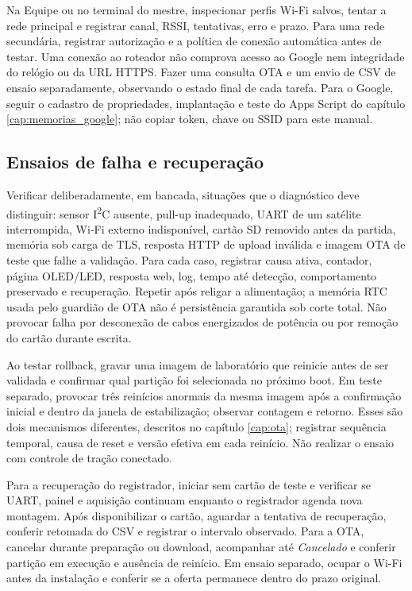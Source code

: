 Na Equipe ou no terminal do mestre, inspecionar perfis Wi-Fi salvos, tentar a rede principal e registrar canal, RSSI, tentativas, erro e prazo. Para uma rede secundária, registrar autorização e a política de conexão automática antes de testar. Uma conexão ao roteador não comprova acesso ao Google nem integridade do relógio ou da URL HTTPS. Fazer uma consulta OTA e um envio de CSV de ensaio separadamente, observando o estado final de cada tarefa. Para o Google, seguir o cadastro de propriedades, implantação e teste do Apps Script do capítulo \ref{cap:memorias_google}; não copiar token, chave ou SSID para este manual.

\subsection{Ensaios de falha e recuperação}\label{sec:ensaios-falha}
Verificar deliberadamente, em bancada, situações que o diagnóstico deve distinguir: sensor I\textsuperscript{2}C ausente, pull-up inadequado, UART de um satélite interrompida, Wi-Fi externo indisponível, cartão SD removido antes da partida, memória sob carga de TLS, resposta HTTP de upload inválida e imagem OTA de teste que falhe a validação. Para cada caso, registrar causa ativa, contador, página OLED/LED, resposta web, log, tempo até detecção, comportamento preservado e recuperação. Repetir após religar a alimentação; a memória RTC usada pelo guardião de OTA não é persistência garantida sob corte total. Não provocar falha por desconexão de cabos energizados de potência ou por remoção do cartão durante escrita.

Ao testar rollback, gravar uma imagem de laboratório que reinicie antes de ser validada e confirmar qual partição foi selecionada no próximo boot. Em teste separado, provocar três reinícios anormais da mesma imagem após a confirmação inicial e dentro da janela de estabilização; observar contagem e retorno. Esses são dois mecanismos diferentes, descritos no capítulo \ref{cap:ota}; registrar sequência temporal, causa de reset e versão efetiva em cada reinício. Não realizar o ensaio com controle de tração conectado.

Para a recuperação do registrador, iniciar sem cartão de teste e verificar se UART, painel e aquisição continuam enquanto o registrador agenda nova montagem. Após disponibilizar o cartão, aguardar a tentativa de recuperação, conferir retomada do CSV e registrar o intervalo observado. Para a OTA, cancelar durante preparação ou download, acompanhar até \emph{Cancelado} e conferir partição em execução e ausência de reinício. Em ensaio separado, ocupar o Wi-Fi antes da instalação e conferir se a oferta permanece dentro do prazo original.

